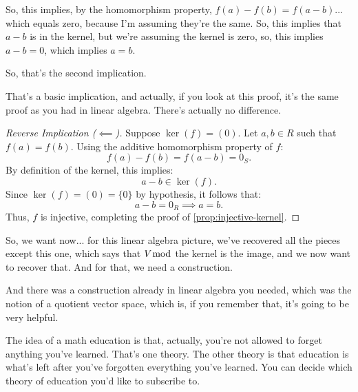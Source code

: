 \begin{proofWrapper}
\begin{speech}[00:25:38 - 00:26:43]
So, this implies, by the homomorphism property, $f(a) - f(b) = f(a - b)$...  which equals zero, because I'm assuming they're the same. So, this implies that $a - b$ is in the kernel,  but we're assuming the kernel is zero, so, this implies $a - b = 0$, which implies $a = b$.  

So, that's the second implication. 

That's a basic implication, and actually, if you look at this proof, it's the same proof as you had in linear algebra. There's actually no difference.
\end{speech}

\begin{content}
\begin{proof}[Reverse Implication ($\impliedby$)]
Suppose $\ker(f) = (0)$. Let $a, b \in R$ such that $f(a) = f(b)$.
Using the additive homomorphism property of $f$:
\[
f(a) - f(b) = f(a - b) = 0_S.
\]
By definition of the kernel, this implies:
\[
a - b \in \ker(f).
\]
Since $\ker(f) = (0) = \{0\}$ by hypothesis, it follows that:
\[
a - b = 0_R \implies a = b.
\]
Thus, $f$ is injective, completing the proof of \cref{prop:injective-kernel}.
\end{proof}
\end{content}

\end{proofWrapper}

\begin{hidden}
\end{hidden}

\begin{speech}[00:26:43 - 00:28:05]
So, we want now... for this linear algebra picture, we've recovered all the pieces except this one,  which says that $V \bmod$ the kernel is the image, and we now want to recover that. And for that, we need a construction. 

And there was a construction already in linear algebra you needed, which was the notion of a quotient vector space, which is, if you remember that, it's going to be very helpful. 

The idea of a math education is that, actually, you're not allowed to forget anything you've learned. That's one theory. The other theory is that education is what's left after you've forgotten everything you've learned. You can decide which theory of education you'd like to subscribe to.
\end{speech}

